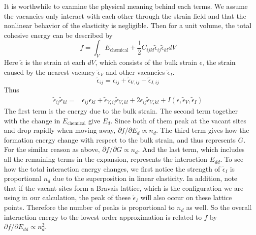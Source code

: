 \documentclass[%
 reprint,
 nofootinbib,
 amsmath,amssymb,
 aps,
]{revtex4-1}
\begin{document}
It is worthwhile to examine the physical meaning behind each terms.
We assume the vacancies only interact with each other through the strain field and that the nonlinear behavior of the elasticity is negligible.
Then for a unit volume, the total cohesive energy can be described by
\begin{equation}
\label{eq:f_explain}
f =  \int_V E_{\mathrm{chemical}} + \frac{1}{2}C_{ijkl}\widetilde{\epsilon}_{ij}\widetilde{\epsilon}_{kl} dV
\end{equation}
Here $\widetilde{\epsilon}$ is the strain at each $dV$, which consists of the bulk strain $\epsilon$, the strain caused by the nearest vacancy $\widetilde{\epsilon}_V$ and other vacancies $\widetilde{\epsilon}_I$.
\begin{equation}
  \widetilde{\epsilon}_{ij} = \epsilon_{ij} + \widetilde{\epsilon}_{V,ij} + \widetilde{\epsilon}_{I,ij}
\end{equation}
Thus
\begin{align}
  \widetilde{\epsilon}_{ij}\widetilde{\epsilon}_{kl}
  = & \epsilon_{ij}\epsilon_{kl} + \widetilde{\epsilon}_{V,ij}\widetilde{\epsilon}_{V,kl}
  + 2\epsilon_{ij}\widetilde{\epsilon}_{V,kl}
  + I(\epsilon, \widetilde{\epsilon}_{V}, \widetilde{\epsilon}_{I})
\end{align}
The first term is the energy due to the bulk strain.
The second term together with the change in $E_\mathrm{chemical}$ give $E_d$.
Since both of them peak at the vacant sites and drop rapidly when moving away, $\partial f /\partial E_d \propto n_d$.
The third term gives how the formation energy change with respect to the bulk strain, and thus represents $G$.
For the similar reason as above, $\partial f/\partial G \propto n_d$.
And the last term, which includes all the remaining terms in the expansion, represents the interaction $E_{dd}$.
To see how the total interaction energy changes, we first notice the strength of $\widetilde{\epsilon}_I$ is proportional $n_d$ due to the superposition in linear elasticity.
In addition, note that if the vacant sites form a Bravais lattice, which is the configuration we are using in our calculation, the peak of these $\widetilde{\epsilon}_I$ will also occur on these lattice points.
Therefore the number of peaks is proportional to $n_d$ as well.
So the overall interaction energy to the lowest order approximation is related to $f$ by $\partial f/\partial E_{dd} \propto n_d^2$.
\end{document}
